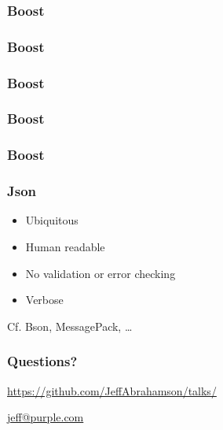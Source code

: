 \documentclass[t]{beamer}
\begin{document}
\begin{frame}
  \frametitle{Boost}

  
\end{frame}

\begin{frame}
  \frametitle{Boost}

  
\end{frame}

\begin{frame}
  \frametitle{Boost}

  
\end{frame}

\begin{frame}
  \frametitle{Boost}

  
\end{frame}

\begin{frame}
  \frametitle{Boost}

  
\end{frame}

\begin{frame}
  \frametitle{Json}

  \begin{itemize}
  \item Ubiquitous
  \item Human readable
  \item No validation or error checking
  \item Verbose
  \end{itemize}

  Cf. Bson, MessagePack, \dots
\end{frame}

\begin{frame}
  \frametitle{Questions?}

  \centerline{\url{https://github.com/JeffAbrahamson/talks/}}
  \vspace{1cm}
  \centerline{\url{jeff@purple.com}}
\end{frame}
\end{document}
